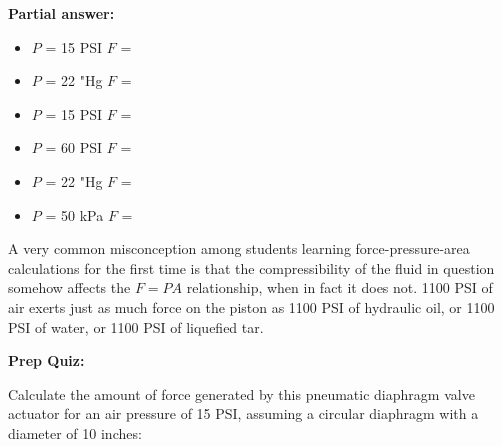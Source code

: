 





\noindent
{\bf Partial answer:}

\vskip 10pt

\begin{itemize}
\item{} $P$ = 15 PSI \hskip 30pt $F$ = 
\vskip 5pt
\item{} $P$ = 22 "Hg \hskip 30pt $F$ = 
\end{itemize}







\begin{itemize}
\item{} $P$ = 15 PSI \hskip 30pt $F$ = 
\vskip 5pt
\item{} $P$ = 60 PSI \hskip 30pt $F$ = 
\vskip 5pt
\item{} $P$ = 22 "Hg \hskip 30pt $F$ = 
\vskip 5pt
\item{} $P$ = 50 kPa \hskip 30pt $F$ = 
\end{itemize}

A very common misconception among students learning force-pressure-area calculations for the first time is that the compressibility of the fluid in question somehow affects the $F = PA$ relationship, when in fact it does not.  1100 PSI of air exerts just as much force on the piston as 1100 PSI of hydraulic oil, or 1100 PSI of water, or 1100 PSI of liquefied tar.














\vfil \eject

\noindent
{\bf Prep Quiz:}

Calculate the amount of force generated by this pneumatic diaphragm valve actuator for an air pressure of 15 PSI, assuming a circular diaphragm with a diameter of 10 inches:

